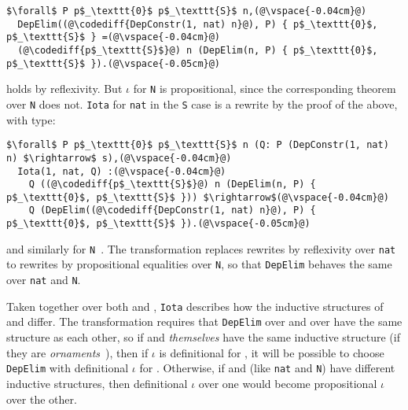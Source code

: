 \begin{lstlisting}
$\forall$ P p$_\texttt{0}$ p$_\texttt{S}$ n,(@\vspace{-0.04cm}@)
  DepElim((@\codediff{DepConstr(1, nat) n}@), P) { p$_\texttt{0}$, p$_\texttt{S}$ } =(@\vspace{-0.04cm}@)
  (@\codediff{p$_\texttt{S}$}@) n (DepElim(n, P) { p$_\texttt{0}$, p$_\texttt{S}$ }).(@\vspace{-0.05cm}@)
\end{lstlisting}
holds by reflexivity.
But $\iota$ for \lstinline{N} is propositional, since the corresponding 
theorem over \lstinline{N} does not.
\lstinline{Iota} for \lstinline{nat} in the \lstinline{S} case is a rewrite by the proof of the above,
with type:

\begin{lstlisting}
$\forall$ P p$_\texttt{0}$ p$_\texttt{S}$ n (Q: P (DepConstr(1, nat) n) $\rightarrow$ s),(@\vspace{-0.04cm}@)
  Iota(1, nat, Q) :(@\vspace{-0.04cm}@)
    Q ((@\codediff{p$_\texttt{S}$}@) n (DepElim(n, P) { p$_\texttt{0}$, p$_\texttt{S}$ })) $\rightarrow$(@\vspace{-0.04cm}@)
    Q (DepElim((@\codediff{DepConstr(1, nat) n}@), P) { p$_\texttt{0}$, p$_\texttt{S}$ }).(@\vspace{-0.05cm}@)
\end{lstlisting}
and similarly for \lstinline{N}~\href{https://github.com/uwplse/pumpkin-pi/blob/silent/plugin/coq/nonorn.v}{}.
The transformation replaces rewrites by reflexivity over \lstinline{nat} to rewrites by propositional equalities over \lstinline{N},
so that \lstinline{DepElim} behaves the same over \lstinline{nat} and \lstinline{N}.

Taken together over both \A and \B, \lstinline{Iota} describes how the inductive structures of \A and \B differ.
The transformation requires that \lstinline{DepElim} over \A and over \B have the same structure
as each other, so if \A and \B \textit{themselves} have the same 
inductive structure (if they are \textit{ornaments}~\cite{mcbride}),
then if $\iota$ is definitional for \A, it will be possible to choose
\lstinline{DepElim} with definitional $\iota$ for \B.
Otherwise, if \A and \B (like \lstinline{nat} and \lstinline{N}) have different inductive structures,
then definitional $\iota$ over one would become propositional $\iota$ over the other.

